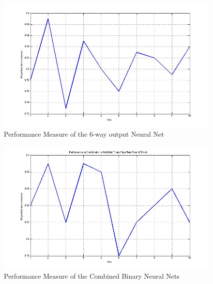 \documentclass[a4paper,12pt,oneside,final]{report}
\newenvironment{changemargin}[2]{\begin{list}{}{%
\setlength{\topsep}{0pt}%
\setlength{\leftmargin}{0pt}%
\setlength{\rightmargin}{0pt}%
\setlength{\listparindent}{\parindent}%
\setlength{\itemindent}{\parindent}%
\setlength{\parsep}{0pt plus 1pt}%
\addtolength{\leftmargin}{#1}%
\addtolength{\rightmargin}{#2}%
}\item }{\end{list}}
\begin{document}
\begin{figure}[!h]
\begin{changemargin}{-20mm}{-20mm}
\center
\includegraphics[scale=0.5]{single_perf.jpg}
\caption{Performance Measure of the 6-way output Neural Net}
\end{changemargin}
\end{figure}

\begin{figure}[!h]
\begin{changemargin}{-20mm}{-20mm}
\center
\includegraphics[scale=0.5]{multi_perf.jpg}
\caption{Performance Measure of the Combined Binary Neural Nets}
\end{changemargin}
\end{figure}
\end{document}
